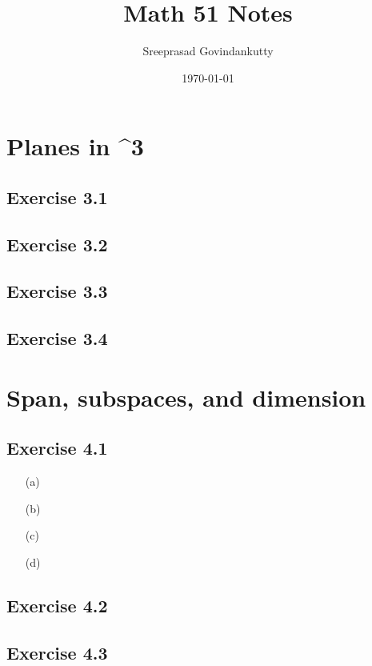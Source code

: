 \documentclass[11pt]{article}
\title{Math 51 Notes}
\author{Sreeprasad Govindankutty}
\date{\today}
\theoremstyle{definition}
\theoremstyle{remark}
\begin{document}
\maketitle
\tableofcontents
\newpage

\section{Planes in ^3}

\subsection{Exercise 3.1}

\subsection{Exercise 3.2}

\subsection{Exercise 3.3}

\subsection{Exercise 3.4}


\section{Span, subspaces, and dimension}

\subsection{Exercise 4.1}

\begin{enumerate}
    \item[(a)] 
    \item[(b)] 
    \item[(c)] 
    \item[(d)] 
\end{enumerate}

\subsection{Exercise 4.2}

\subsection{Exercise 4.3}

\end{document}
